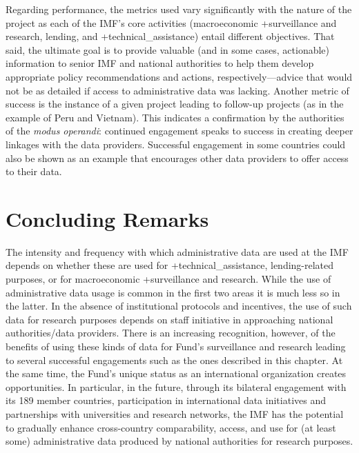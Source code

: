 \documentclass[
]{book}
\begin{document}
Regarding performance, the metrics used vary significantly with the nature of the project as each of the IMF's core activities (macroeconomic +surveillance\textbar{} and research, lending, and +technical\_assistance\textbar) entail different objectives. That said, the ultimate goal is to provide valuable (and in some cases, actionable) information to senior IMF and national authorities to help them develop appropriate policy recommendations and actions, respectively---advice that would not be as detailed if access to administrative data was lacking. Another metric of success is the instance of a given project leading to follow-up projects (as in the example of Peru and Vietnam). This indicates a confirmation by the authorities of the \emph{modus operandi}: continued engagement speaks to success in creating deeper linkages with the data providers. Successful engagement in some countries could also be shown as an example that encourages other data providers to offer access to their data.

\hypertarget{concluding-remarks-4}{%
\section{Concluding Remarks}\label{concluding-remarks-4}}

The intensity and frequency with which administrative data are used at the IMF depends on whether these are used for +technical\_assistance\textbar, lending-related purposes, or for macroeconomic +surveillance\textbar{} and research. While the use of administrative data usage is common in the first two areas it is much less so in the latter. In the absence of institutional protocols and incentives, the use of such data for research purposes depends on staff initiative in approaching national authorities/data providers. There is an increasing recognition, however, of the benefits of using these kinds of data for Fund's surveillance and research leading to several successful engagements such as the ones described in this chapter. At the same time, the Fund's unique status as an international organization creates opportunities. In particular, in the future, through its bilateral engagement with its 189 member countries, participation in international data initiatives and partnerships with universities and research networks, the IMF has the potential to gradually enhance cross-country comparability, access, and use for (at least some) administrative data produced by national authorities for research purposes.
\end{document}

